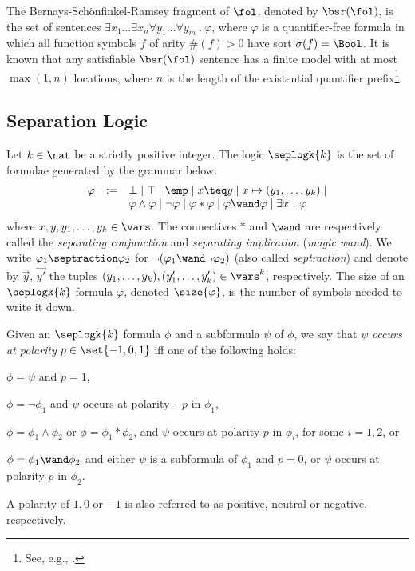 The Bernays-Sch\"onfinkel-Ramsey fragment of $\fol$, denoted by
$\bsr(\fol)$, is the set of sentences $\exists x_1 \ldots \exists x_n
\forall y_1 \ldots \forall y_m ~.~ \varphi$, where $\varphi$ is a
quantifier-free formula in which all function symbols $f$ of arity
$\#(f)>0$ have sort $\sigma(f)=\Bool$. It is known that any
satisfiable $\bsr(\fol)$ sentence has a finite model with at most
$\max(1,n)$ locations, where $n$ is the length of the existential
quantifier prefix\footnote{See, e.g., \cite[Proposition
    6.2.17]{BorgerGradelGurevich97}.}.

\subsection{Separation Logic}

Let $k \in \nat$ be a strictly positive integer. The logic $\seplogk{k}$
is the set of formulae generated by the grammar below: 
\[\begin{array}{rcl}
\varphi & := & \bot \mid \top \mid \emp \mid x \teq y \mid x \mapsto
(y_1,\ldots,y_k) \mid \\ && \varphi \wedge \varphi \mid \neg \varphi
\mid \varphi * \varphi \mid \varphi \wand \varphi \mid \exists x ~.~
\varphi
\end{array}\]
where $x,y,y_1,\ldots,y_k \in \vars$. The connectives $*$ and $\wand$
are respectively called the \emph{separating conjunction} and
\emph{separating implication} (\emph{magic wand}). We write $\varphi_1
\septraction \varphi_2$ for $\neg(\varphi_1 \wand \neg \varphi_2)$
(also called \emph{septraction}) and denote by $\vec{y}$, $\vec{y'}$
the tuples $(y_1,\ldots,y_k), (y'_1,\ldots,y'_k) \in \vars^k$,
respectively. The size of an $\seplogk{k}$ formula $\varphi$, denoted
$\size{\varphi}$, is the number of symbols needed to write it down.

Given an $\seplogk{k}$ formula $\phi$ and a subformula $\psi$ of $\phi$,
we say that $\psi$ \emph{occurs at polarity} $p \in \set{-1,0,1}$ iff
one of the following holds: \begin{inparaenum}[(i)]
\item $\phi = \psi$ and $p=1$, 
%
\item $\phi = \neg\phi_1$ and $\psi$ occurs at polarity $-p$ in
  $\phi_1$,
%
\item $\phi = \phi_1 \wedge \phi_2$ or $\phi = \phi_1 * \phi_2$, and
  $\psi$ occurs at polarity $p$ in $\phi_i$, for some $i=1,2$, or
%
\item $\phi = \phi_1 \wand \phi_2$ and either $\psi$ is a subformula
  of $\phi_1$ and $p=0$, or $\psi$ occurs at polarity $p$ in $\phi_2$.
\end{inparaenum}
A polarity of $1,0$ or $-1$ is also referred to as positive, neutral
or negative, respectively. 

